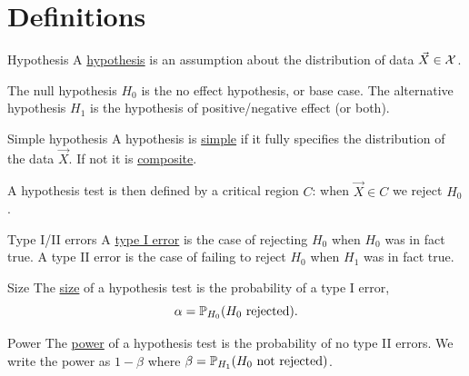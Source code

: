 \documentclass[../Main.tex]{subfiles}
\begin{document}
\section{Definitions}
\begin{definition}{Hypothesis}
    A \underline{hypothesis} is an assumption about the distribution of data $\vec{X} \in \samplespace$.
\end{definition}
The null hypothesis $H_0$ is the no effect hypothesis, or base case. The alternative hypothesis $H_1$ is the hypothesis of positive/negative effect (or both).
\begin{definition}{Simple hypothesis}
    A hypothesis is \underline{simple} if it fully specifies the distribution of the data $\vec{X}$. If not it is \underline{composite}.
\end{definition}
A hypothesis test is then defined by a critical region $C$: when $\vec{X} \in C$ we reject $H_0$.
\begin{definition}{Type I/II errors}
    A \underline{type I error} is the case of rejecting $H_0$ when $H_0$ was in fact true. A type II error is the case of failing to reject $H_0$ when $H_1$ was in fact true.
\end{definition}
\begin{definition}{Size}
    The \underline{size} of a hypothesis test is the probability of a type I error,
    \begin{equation*}
        \alpha = \P_{H_0}(\text{$H_0$ rejected}).
    \end{equation*}
\end{definition}
\begin{definition}{Power}
    The \underline{power} of a hypothesis test is the probability of no type II errors. We write the power as $1-\beta$ where $\beta = \P_{H_1}(\text{$H_0$ not rejected})$.
\end{definition}
\end{document}
